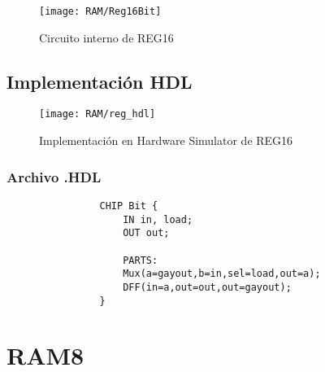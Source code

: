 \documentclass[12pt]{article}
\begin{document}
		\begin{figure}[H]
			\centering
			\texttt{[image: RAM/Reg16Bit]}
			\caption{Circuito interno de REG16}
			\label{fig:reg16bit}
		\end{figure}

	\subsection{Implementación HDL}
		\begin{figure}[H]
			\centering
			\texttt{[image: RAM/reg\_hdl]}
			\caption{Implementación en Hardware Simulator de REG16}
			\label{fig:reghdl}
		\end{figure}

		\subsubsection{Archivo .HDL}
			\begin{lstlisting}
				CHIP Bit {
					IN in, load;
					OUT out;

					PARTS:
					Mux(a=gayout,b=in,sel=load,out=a);
					DFF(in=a,out=out,out=gayout);
				}
			\end{lstlisting}

\newpage
\section{RAM8}
\end{document}
